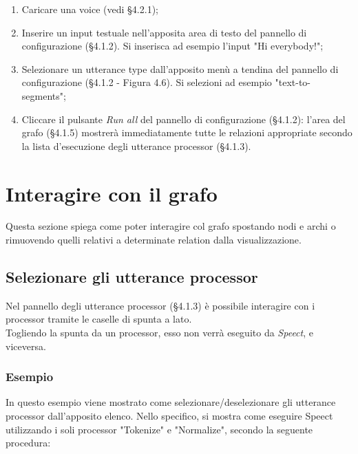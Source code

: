 \documentclass[openany,12pt,a4paper]{report}
\begin{document}
	\begin{enumerate}
		\item Caricare una voice (vedi §4.2.1);
		\item Inserire un input testuale nell'apposita area di testo del pannello di configurazione (§4.1.2). Si inserisca ad esempio l'input "Hi everybody!";
		\item Selezionare un utterance type dall'apposito menù a tendina del pannello di configurazione (§4.1.2 - Figura 4.6). Si selezioni ad esempio "text-to-segments";
		\item Cliccare il pulsante \textit{Run all} del pannello di configurazione (§4.1.2): l'area del grafo (§4.1.5) mostrerà immediatamente tutte le relazioni appropriate secondo la lista d'esecuzione degli utterance processor (§4.1.3).
	\end{enumerate}

	\section{Interagire con il grafo}
	Questa sezione spiega come poter interagire col grafo spostando nodi e archi o rimuovendo quelli relativi a determinate relation dalla visualizzazione.
	
	\subsection{Selezionare gli utterance processor}
	Nel pannello degli utterance processor (§4.1.3) è possibile interagire con i processor tramite le caselle di spunta a lato.\\
	Togliendo la spunta da un processor, esso non verrà eseguito da \textit{Speect}, e viceversa.
	
	\subsubsection*{Esempio}
	
	In questo esempio viene mostrato come selezionare/deselezionare gli utterance processor dall'apposito elenco. Nello specifico, si mostra come eseguire Speect utilizzando i soli processor "Tokenize" e "Normalize", secondo la seguente procedura:
	
\end{document}
